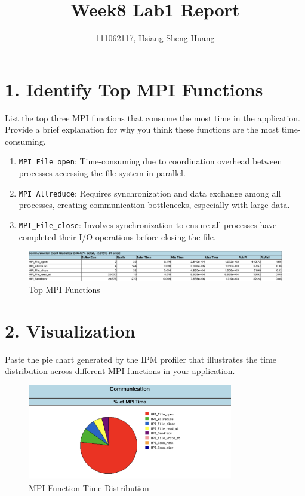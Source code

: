 \documentclass{article}
\title{Week8 Lab1 Report}
\author{111062117, Hsiang-Sheng Huang}
\begin{document}
\maketitle

\section*{1. Identify Top MPI Functions}

List the top three MPI functions that consume the most time in the application. Provide a brief explanation for why you think these functions are the most time-consuming.

\begin{enumerate}
    \item \texttt{MPI\_File\_open}: Time-consuming due to coordination overhead between processes accessing the file system in parallel.
    \item \texttt{MPI\_Allreduce}: Requires synchronization and data exchange among all processes, creating communication bottlenecks, especially with large data.
    \item \texttt{MPI\_File\_close}: Involves synchronization to ensure all processes have completed their I/O operations before closing the file.
\end{enumerate}

\begin{figure}[h]
    \centering
    \includegraphics[width=1\textwidth]{./img/q1.png}
    \caption{Top MPI Functions}
\end{figure}

\section*{2. Visualization}

Paste the pie chart generated by the IPM profiler that illustrates the time distribution across different MPI functions in your application.

\begin{figure}[h]
    \centering
    \includegraphics[width=0.8\textwidth]{./img/q2.png}
    \caption{MPI Function Time Distribution}
\end{figure}
\end{document}
